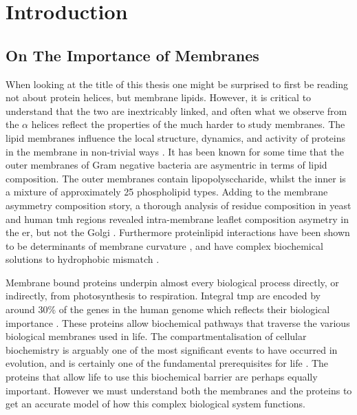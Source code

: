 \chapter{Introduction}

\section{On The Importance of Membranes}
When looking at the title of this thesis one might be surprised to first be reading not about protein helices, but membrane lipids. However, it is critical to understand that the two are inextricably linked, and often what we observe from the $\alpha$ helices reflect the properties of the much harder to study membranes. The lipid membranes influence the local structure, dynamics, and activity of proteins in the membrane in non-trivial ways \cite{Bondar2010, Bondar2009, Jardon-Valadez2010, Kalvodova2005, Urban2005}. It has been known for some time that the outer membranes of Gram negative bacteria are asymentric in terms of lipid composition. The outer membranes contain lipopolysccharide, whilst the inner is a mixture of approximately 25 phospholipid types. Adding to the membrane asymmetry composition story, a thorough analysis of residue composition in yeast and human \gls{tmh} regions revealed intra-membrane leaflet composition asymetry in the \gls{er}, but not the Golgi \cite{Sharpe2010}. Furthermore protein\-lipid interactions have been shown to be determinants of membrane curvature \cite{Jensen2004}, and have complex biochemical solutions to hydrophobic mismatch \cite{Planque2003}. %

Membrane bound proteins underpin almost every biological process directly, or indirectly, from photosynthesis to respiration. Integral \gls{tmp} are encoded by around 30\% of the genes in the human genome which reflects their biological importance \cite{Almen2009}. These proteins allow biochemical pathways that traverse the various biological membranes used in life. The compartmentalisation of cellular biochemistry is arguably one of the most significant events to have occurred in evolution, and is certainly one of the fundamental prerequisites for life \cite{Koshland2002}. The proteins that allow life to use this biochemical barrier are perhaps equally important. However we must understand both the membranes and the proteins to get an accurate model of how this complex biological system functions.

